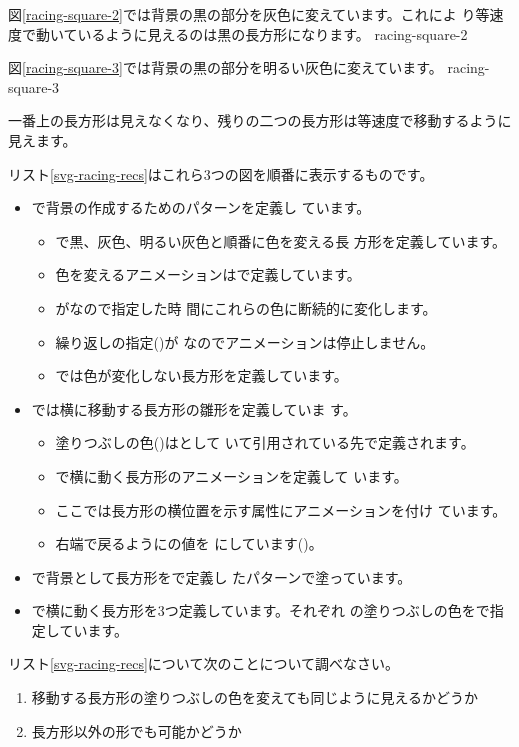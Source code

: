 図\ref{racing-square-2}では背景の黒の部分を灰色に変えています。これによ
り等速度で動いているように見えるのは黒の長方形になります。
{racing-square-2}

図\ref{racing-square-3}では背景の黒の部分を明るい灰色に変えています。
{racing-square-3}

一番上の長方形は見えなくなり、残りの二つの長方形は等速度で移動するように
見えます。

リスト\ref{svg-racing-recs}はこれら3つの図を順番に表示するものです。
\begin{itemize}
 \item {}で背景の作成するためのパターンを定義し
       ています。
\begin{itemize}
 \item {}で黒、灰色、明るい灰色と順番に色を変える長
       方形を定義しています。
 \item 色を変えるアニメーションはで定義しています。
 \item {}がなので指定した時
       間にこれらの色に断続的に変化します。
 \item 繰り返しの指定()が
       なのでアニメーションは停止しません。
 \item {}では色が変化しない長方形を定義しています。
\end{itemize}
 \item {}では横に移動する長方形の雛形を定義していま
       す。
\begin{itemize}
 \item 塗りつぶしの色()はとして
       いて引用されている先で定義されます。
 \item {}で横に動く長方形のアニメーションを定義して
       います。
 \item ここでは長方形の横位置を示す属性にアニメーションを付け
       ています。
 \item 右端で戻るようにの値を
       にしています()。
\end{itemize}
 \item {}で背景として長方形をで定義し
       たパターンで塗っています。
 \item {}で横に動く長方形を3つ定義しています。それぞれ
       の塗りつぶしの色をで指定しています。
\end{itemize}
\begin{Problem}\upshape
 リスト\ref{svg-racing-recs}について次のことについて調べなさい。
\begin{enumerate}
 \item 移動する長方形の塗りつぶしの色を変えても同じように見えるかどうか
 \item 長方形以外の形でも可能かどうか
\end{enumerate}
\end{Problem}